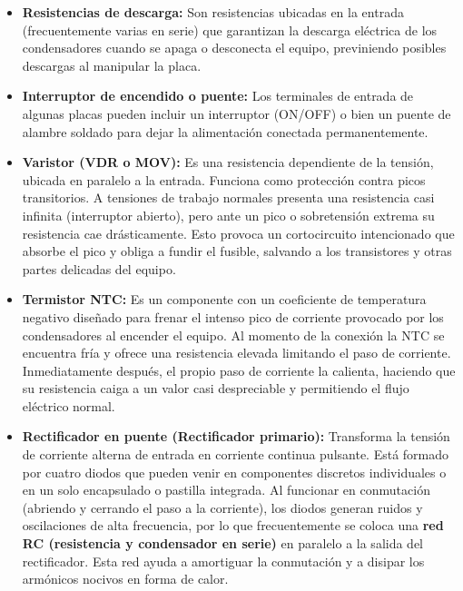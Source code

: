 \documentclass[12pt, a4paper]{article}
\begin{document}
\begin{itemize}[itemsep=1.5ex]
    \item \textbf{Resistencias de descarga:} Son resistencias ubicadas en la entrada (frecuentemente varias en serie) que garantizan la descarga eléctrica de los condensadores cuando se apaga o desconecta el equipo, previniendo posibles descargas al manipular la placa.

    \item \textbf{Interruptor de encendido o puente:} Los terminales de entrada de algunas placas pueden incluir un interruptor (ON/OFF) o bien un puente de alambre soldado para dejar la alimentación conectada permanentemente.

    \item \textbf{Varistor (VDR o MOV):} Es una resistencia dependiente de la tensión, ubicada en paralelo a la entrada. Funciona como protección contra picos transitorios. A tensiones de trabajo normales presenta una resistencia casi infinita (interruptor abierto), pero ante un pico o sobretensión extrema su resistencia cae drásticamente. Esto provoca un cortocircuito intencionado que absorbe el pico y obliga a fundir el fusible, salvando a los transistores y otras partes delicadas del equipo.

    \item \textbf{Termistor NTC:} Es un componente con un coeficiente de temperatura negativo diseñado para frenar el intenso pico de corriente provocado por los condensadores al encender el equipo. Al momento de la conexión la NTC se encuentra fría y ofrece una resistencia elevada limitando el paso de corriente. Inmediatamente después, el propio paso de corriente la calienta, haciendo que su resistencia caiga a un valor casi despreciable y permitiendo el flujo eléctrico normal.

    \item \textbf{Rectificador en puente (Rectificador primario):} Transforma la tensión de corriente alterna de entrada en corriente continua pulsante. Está formado por cuatro diodos que pueden venir en componentes discretos individuales o en un solo encapsulado o pastilla integrada. Al funcionar en conmutación (abriendo y cerrando el paso a la corriente), los diodos generan ruidos y oscilaciones de alta frecuencia, por lo que frecuentemente se coloca una \textbf{red RC (resistencia y condensador en serie)} en paralelo a la salida del rectificador. Esta red ayuda a amortiguar la conmutación y a disipar los armónicos nocivos en forma de calor.
\end{itemize}

\newpage
\end{document}
